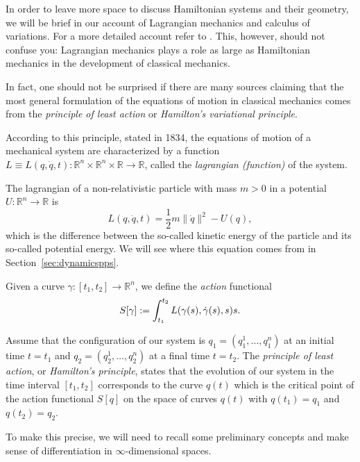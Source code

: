 \documentclass[english,fontsize=11pt,paper=a5,oneside]{scrbook}
\newcommand{\R}{\mathbb{R}}
\let\d\relax
\newcommand{\d}{\mathrm{d}}
\theoremstyle{definition}
\newenvironment{example}
  {\pushQED{\qed}\renewcommand{\qedsymbol}{$\lozenge$}\examplex}
  {\popQED\endexamplex}
\begin{document}
In order to leave more space to discuss Hamiltonian systems and their geometry, we will be brief in our account of Lagrangian mechanics and calculus of variations. For a more detailed account refer to \cite[Part II]{book:arnold}.
This, however, should not confuse you: Lagrangian mechanics plays a role as large as Hamiltonian mechanics in the development of classical mechanics.

In fact, one should not be surprised if there are many sources claiming that the most general formulation of the equations of motion in classical mechanics comes from the \emph{principle of least action} or \emph{Hamilton's variational principle}.

According to this principle, stated in 1834, the equations of motion of a mechanical system are characterized by a function $L \equiv L(q, \dot q, t) : \R^n \times \R^n \times \R \to \R$, called the \emph{lagrangian (function)} of the system.

\begin{example}
  The lagrangian of a non-relativistic particle with mass $m > 0$ in a potential $U : \R^n \to \R$ is
  \begin{equation}
    L(q, \dot q, t) = \frac12 m \|\dot q\|^2 - U(q),
  \end{equation}
  which is the difference between the so-called kinetic energy of the particle and its so-called potential energy.
  We will see where this equation comes from in Section~\ref{sec:dynamicspps}.
\end{example}

Given a curve $\gamma:[t_1, t_2] \to \R^n$, we define the \emph{action} functional
\begin{equation}\label{eq:Laction}
  S[\gamma] := \int_{t_1}^{t_2} L(\gamma(s), \dot \gamma(s), s) \d s.
\end{equation}

\begin{tcolorbox}
  Assume that the configuration of our system is $q_1 = (q_1^1, \ldots, q_1^n)$ at an initial time $t=t_1$ and $q_2 = (q_2^1, \ldots, q_2^n)$ at a final time $t = t_2$. The \emph{principle of least action}, or \emph{Hamilton's principle}, states that the evolution of our system in the time interval $[t_1, t_2]$ corresponds to the curve $q(t)$ which is the critical point of the action functional $S[q]$ on the space of curves $q(t)$ with $q(t_1) = q_1$ and $q(t_2) = q_2$.
\end{tcolorbox}

To make this precise, we will need to recall some preliminary concepts and make sense of differentiation in $\infty$-dimensional spaces.
\end{document}
